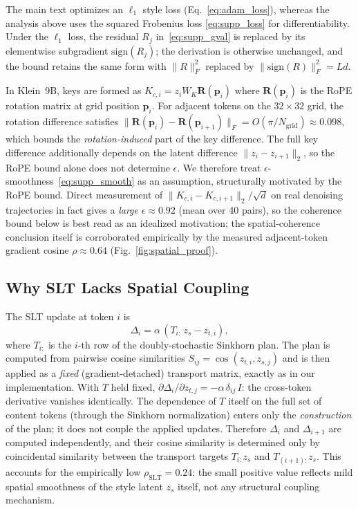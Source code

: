 \begin{remark}
The main text optimizes an $\ell_1$ style loss (Eq.~\ref{eq:adam_loss}),
whereas the analysis above uses the squared Frobenius loss
\eqref{eq:supp_loss} for differentiability.
Under the $\ell_1$ loss, the residual $R_j$ in~\eqref{eq:supp_gval} is
replaced by its elementwise subgradient $\mathrm{sign}(R_j)$; the derivation
is otherwise unchanged, and the bound retains the same form with
$\|R\|_F^2$ replaced by $\|\mathrm{sign}(R)\|_F^2 = Ld$.
\end{remark}

\begin{remark}
In Klein~9B, keys are formed as $K_{c,i} = z_i W_K \mathbf{R}(\mathbf{p}_i)$
where $\mathbf{R}(\mathbf{p}_i)$ is the RoPE rotation matrix at grid
position $\mathbf{p}_i$.
For adjacent tokens on the $32\times32$ grid, the rotation difference satisfies
$\|\mathbf{R}(\mathbf{p}_i) - \mathbf{R}(\mathbf{p}_{i+1})\|_F = O(\pi/N_\text{grid}) \approx 0.098$,
which bounds the \emph{rotation-induced} part of the key difference.
The full key difference additionally depends on the latent difference
$\|z_i - z_{i+1}\|_2$, so the RoPE bound alone does not determine $\epsilon$.
We therefore treat $\epsilon$-smoothness~\eqref{eq:supp_smooth} as an
assumption, structurally motivated by the RoPE bound. Direct measurement of
$\|K_{c,i} - K_{c,i+1}\|_2/\sqrt{d}$ on real denoising trajectories in fact
gives a \emph{large} $\epsilon \approx 0.92$ (mean over 40 pairs), so the
coherence bound below is best read as an idealized motivation; the
spatial-coherence conclusion itself is corroborated empirically by the measured
adjacent-token gradient cosine $\rho \approx 0.64$
(Fig.~\ref{fig:spatial_proof}).
\end{remark}

\subsection{Why SLT Lacks Spatial Coupling}

The SLT update at token $i$ is
\begin{equation}
  \Delta_i = \alpha\,(T_{i:}\,z_s - z_{t,i}),
  \label{eq:supp_slt}
\end{equation}
where $T_{i:}$ is the $i$-th row of the doubly-stochastic Sinkhorn plan.
The plan is computed from pairwise cosine similarities
$S_{ij} = \cos(z_{t,i}, z_{s,j})$ and is then applied as a \emph{fixed}
(gradient-detached) transport matrix, exactly as in our implementation.
With $T$ held fixed,
$\partial\Delta_i/\partial z_{t,j} = -\alpha\,\delta_{ij}\,I$: the
cross-token derivative vanishes identically.
The dependence of $T$ itself on the full set of content tokens (through the
Sinkhorn normalization) enters only the \emph{construction} of the plan; it
does not couple the applied updates.
Therefore $\Delta_i$ and $\Delta_{i+1}$ are computed independently, and their
cosine similarity is determined only by coincidental similarity between the
transport targets $T_{i:}z_s$ and $T_{(i+1):}z_s$.
This accounts for the empirically low $\rho_\text{SLT} = 0.24$: the small
positive value reflects mild spatial smoothness of the style latent $z_s$
itself, not any structural coupling mechanism.

